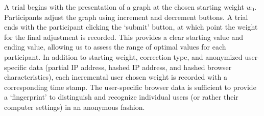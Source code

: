 \documentclass[12pt]{article}\usepackage[]{graphicx}\usepackage[]{color}
\begin{document}

A trial begins with the presentation of a graph at the chosen starting weight $w_0$. Participants adjust the graph using increment and decrement buttons. A trial ends with the participant clicking the `submit' button, at which point the weight for the final adjustment is recorded. This provides a clear starting value and ending value, allowing us to assess the range of optimal values for each participant. In addition to starting weight, correction type, and anonymized user-specific data (partial IP address, hashed IP address, and hashed browser characteristics), each incremental user chosen weight is recorded with a corresponding time stamp. The user-specific browser data is sufficient to provide a `fingerprint' to distinguish and recognize individual users (or rather their computer settings) in an anonymous fashion. 
% 
%
%

%
\end{document}
